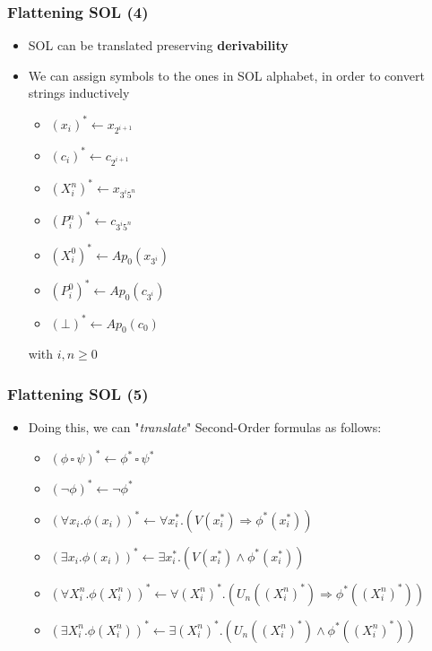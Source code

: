 \documentclass{beamer}
\begin{document}
                \begin{frame}
                    \frametitle{Flattening SOL (4)}
                    \begin{itemize}
                        \item SOL can be translated preserving \textbf{derivability}
                        \item We can assign symbols to the ones in SOL alphabet, in order to convert strings inductively
                        \begin{itemize}
                            \item $ (x_i)^* \leftarrow x_{2^{i + 1}} $
                            \item $ (c_i)^* \leftarrow c_{2^{i + 1}} $
                            \item $ (X^n_i)^* \leftarrow x_{3^i5^n} $
                            \item $ (P^n_i)^* \leftarrow c_{3^i5^n} $
                            \item $ (X^0_i)^* \leftarrow Ap_0(x_{3^i}) $
                            \item $ (P^0_i)^* \leftarrow Ap_0(c_{3^i}) $
                            \item $ (\bot)^* \leftarrow Ap_0(c_0) $
                        \end{itemize}
                        with $ i,n \geq 0 $
                    \end{itemize}
                \end{frame}

                \begin{frame}
                    \frametitle{Flattening SOL (5)}
                    \begin{itemize}
                        \item Doing this, we can "\textit{translate}" Second-Order formulas as follows:
                              \begin{itemize}
                                \item $ (\phi\, \square\, \psi)^* \leftarrow \phi^*\, \square\, \psi^* $
                                \item $ (\neg \phi)^* \leftarrow \neg \phi^* $
                                \item $ (\forall x_i. \phi(x_i))^* \leftarrow \forall x_i^*. (V(x_i^*) \Rightarrow \phi^*(x_i^*)) $
                                \item $ (\exists x_i. \phi(x_i))^* \leftarrow \exists x_i^*. (V(x_i^*) \wedge \phi^*(x_i^*)) $
                                \item $ (\forall X^n_i. \phi(X^n_i))^* \leftarrow \forall (X^n_i)^*. (U_n((X^n_i)^*) \Rightarrow \phi^*((X^n_i)^*)) $
                                \item $ (\exists X^n_i. \phi(X^n_i))^* \leftarrow \exists (X^n_i)^*. (U_n((X^n_i)^*) \wedge \phi^*((X^n_i)^*)) $
                              \end{itemize}
                    \end{itemize}
                \end{frame}
\end{document}
